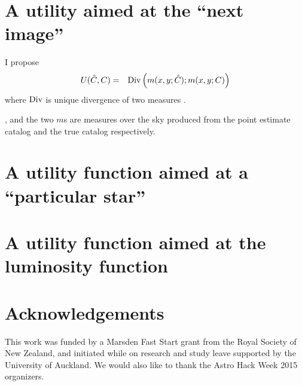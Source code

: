 \documentclass[a4paper,fleqn,usenatbib]{mnras}
\begin{document}
\section{A utility aimed at the ``next image''}

I propose
\begin{eqnarray}
U(\hat{C}, C) &=& \textnormal{Div}\left(m(x, y; \hat{C}); m(x, y; C)\right)
\end{eqnarray}
where $\textnormal{Div}$ is unique divergence of
two measures \citep{knuth2012foundations}.

, and the two $m$s are measures over the sky produced from the
point estimate catalog and the true catalog respectively.


\section{A utility function aimed at a ``particular star''}


\section{A utility function aimed at the luminosity function}



\section*{Acknowledgements}
This work was funded by a Marsden Fast Start grant from the Royal Society of
New Zealand, and initiated while on research and study leave supported by
the University of Auckland. We would also like to thank the Astro Hack Week
2015 organizers.












\bsp	%
\label{lastpage}
\end{document}
